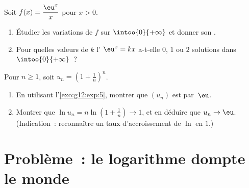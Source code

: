 \begin{exercise}[$\star\star\star$]\label{exo:g12:exp:8}
Soit $f(x) = \dfrac{\eu^x}{x}$ pour $x > 0$.
\begin{enumerate}
  \item Étudier les variations de $f$ sur $\intoo{0}{+\infty}$ et donner
        son .
  \item Pour quelles valeurs de $k$ l' $\eu^x = kx$ a-t-elle $0$,
        $1$ ou $2$ solutions dans $\intoo{0}{+\infty}$~?
\end{enumerate}
\end{exercise}

\begin{exercise}[$\star\star\star$]\label{exo:g12:exp:9}
Pour $n \geq 1$, soit $u_n = \left(1 + \frac1n\right)^n$.
\begin{enumerate}
  \item En utilisant l'\cref{exo:g12:exp:5}, montrer que $(u_n)$ est
         par~$\eu$.
  \item Montrer que $\ln u_n = n \ln\left(1 + \frac1n\right) \to 1$, et en
        déduire que $u_n \to \eu$.
        (Indication~: reconnaître un taux d'accroissement de $\ln$ en $1$.)
\end{enumerate}
\end{exercise}

\section{Problème~: le logarithme dompte le monde}

